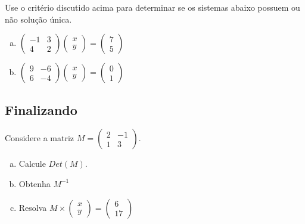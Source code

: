 \documentclass[main_estudante.tex]{subfiles}
\begin{document}
\begin{questao}
Use o critério discutido acima para determinar se os sistemas abaixo possuem ou não solução única.
\begin{enumerate}[a)]
\item $\begin{pmatrix}-1 & 3 \\ 4 & 2\end{pmatrix} \begin{pmatrix}x \\ y\end{pmatrix} = \begin{pmatrix}7 \\ 5\end{pmatrix}$
\item $\begin{pmatrix} 9 & -6 \\ 6 & -4\end{pmatrix} \begin{pmatrix}x \\ y\end{pmatrix} = \begin{pmatrix}0 \\ 1\end{pmatrix}$
\end{enumerate}
\end{questao}

\subsection*{Finalizando}

\begin{questao}
Considere a matriz $M=\begin{pmatrix}2 & -1 \\ 1 & 3\end{pmatrix}$.
\begin{enumerate}[a)]
\item Calcule $Det(M)$.
\item Obtenha $M^{-1}$
\item Resolva $M \times \begin{pmatrix}x \\ y\end{pmatrix} = \begin{pmatrix}6 \\ 17\end{pmatrix}$
\end{enumerate}
\end{questao}
\end{document}
